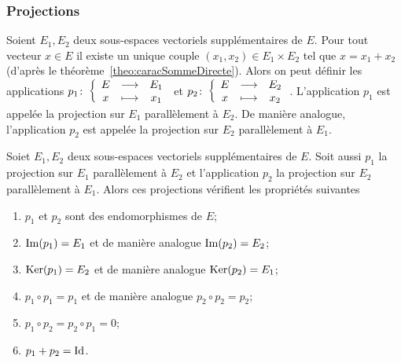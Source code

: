 \subsubsection{Projections}
\label{sec:projections}

\begin{defdef}
  Soient $E_1, E_2$ deux sous-espaces vectoriels supplémentaires de $E$. Pour tout vecteur $x \in E$ il existe un unique couple $(x_1,x_2) \in E_1 \times E_2$ tel que $x=x_1+x_2$ (d'après le théorème~\ref{theo:caracSommeDirecte}). Alors on peut définir les applications $p_1\colon \left\{\begin{array}{ccc} E & \longrightarrow &E_1\\ x & \longmapsto & x_1 \end{array} \right.$ et $p_2\colon \left\{\begin{array}{ccc} E & \longrightarrow &E_2\\ x & \longmapsto & x_2 \end{array} \right.$. L'application $p_1$ est appelée la projection sur $E_1$ parallèlement à $E_2$. De manière analogue, l'application $p_2$ est appelée la projection sur $E_2$ parallèlement à $E_1$.
\end{defdef}

\begin{theo}\label{theo:propprojection}
  Soiet $E_1, E_2$ deux sous-espaces vectoriels supplémentaires de $E$. Soit aussi $p_1$ la projection sur $E_1$ parallèlement à $E_2$ et l'application $p_2$ la projection sur $E_2$ parallèlement à $E_1$. Alors ces projections vérifient les propriétés suivantes
  \begin{enumerate}
  \item $p_1$ et $p_2$ sont des endomorphismes de $E$;
  \item $\operatorname{Im}(p_1)=E_1$ et de manière analogue $\operatorname{Im}(p_2)=E_2$;
  \item $\operatorname{Ker}(p_1)=E_2$ et de manière analogue $\operatorname{Ker}(p_2)=E_1$;
  \item $p_1 \circ p_1=p_1$ et de manière analogue $p_2 \circ p_2=p_2$;
  \item $p_1 \circ p_2 = p_2 \circ p_1=0$;
  \item $p_1+p_2=\operatorname{Id}$.
  \end{enumerate}
\end{theo}


